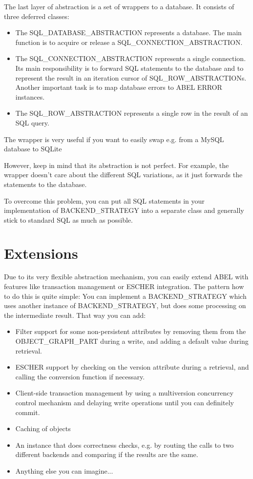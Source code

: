 The last layer of abstraction is a set of wrappers to a database. 
It consists of three deferred classes: 
\begin{itemize}
 \item The SQL\_DATABASE\_ABSTRACTION represents a database. The main function is to acquire or release a SQL\_CONNECTION\_ABSTRACTION.
 \item The SQL\_CONNECTION\_ABSTRACTION represents a single connection. 
Its main responsibility is to forward SQL statements to the database and to represent the result in an iteration cursor of SQL\_ROW\_ABSTRACTIONs.
Another important task is to map database errors to ABEL ERROR instances.
  \item The SQL\_ROW\_ABSTRACTION represents a single row in the result of an SQL query.
\end{itemize}

The wrapper is very useful if you want to easily swap e.g. from a MySQL database to SQLite

However, keep in mind that its abstraction is not perfect. 
For example, the wrapper doesn't care about the different SQL variations, as it just forwards the statements to the database.

To overcome this problem, you can put all SQL statements in your implementation of BACKEND\_STRATEGY into a separate class and generally stick to standard SQL as much as possible.


\section{Extensions}

Due to its very flexible abstraction mechanism, you can easily extend ABEL with features like transaction management or ESCHER  integration.
The pattern how to do this is quite simple: 
You can implement a BACKEND\_STRATEGY which uses another instance of BACKEND\_STRATEGY, but does some processing on the intermediate result.
That way you can add:

\begin{itemize}
 \item Filter support for some non-persistent attributes by removing them from the OBJECT\_GRAPH\_PART during a write, and adding a default value during retrieval.
 \item ESCHER support by checking on the version attribute during a retrieval, and calling the conversion function if necessary.
 \item Client-side transaction management by using a multiversion concurrency control mechanism and delaying write operations until you can definitely commit.
 \item Caching of objects
 \item An instance that does correctness checks, e.g. by routing the calls to two different backends and comparing if the results are the same.
 \item Anything else you can imagine...
\end{itemize}

